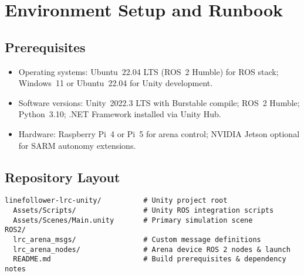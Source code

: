 \documentclass[12pt]{article}
\begin{document}
\section{Environment Setup and Runbook}
\subsection{Prerequisites}
\begin{itemize}
    \item Operating systems: Ubuntu~22.04 LTS (ROS~2 Humble) for ROS stack; Windows~11 or Ubuntu~22.04 for Unity development.
    \item Software versions: Unity~2022.3 LTS with Burstable compile; ROS~2 Humble; Python~3.10; .NET Framework installed via Unity Hub.
    \item Hardware: Raspberry Pi~4 or Pi~5 for arena control; NVIDIA Jetson optional for SARM autonomy extensions.
\end{itemize}

\subsection{Repository Layout}
\begin{verbatim}
linefollower-lrc-unity/          # Unity project root
  Assets/Scripts/                # Unity ROS integration scripts
  Assets/Scenes/Main.unity       # Primary simulation scene
ROS2/
  lrc_arena_msgs/                # Custom message definitions
  lrc_arena_nodes/               # Arena device ROS 2 nodes & launch
  README.md                      # Build prerequisites & dependency notes
\end{verbatim}
\end{document}
